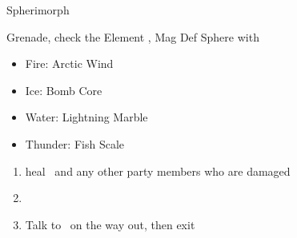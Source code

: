 \begin{battle}[12000]{Spherimorph}
	\begin{itemize}
		\switch{\tidus}{\rikku}
		\rikkuf Grenade, check the Element
		\rikkuf \od, Mag Def Sphere with
		\begin{itemize}
			\item Fire: Arctic Wind
			\item Ice: Bomb Core
			\item Water: Lightning Marble
			\item Thunder: Fish Scale
		\end{itemize}
	\end{itemize}
\end{battle}
\begin{enumerate}[resume]
	\item heal \rikku\ and any other party members who are damaged
	\item \formation{\tidus}{\kimahri}{\auron}
	\item Talk to \auron\ on the way out, then exit
\end{enumerate}
